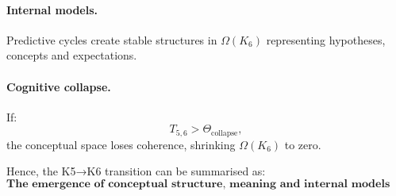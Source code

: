 \paragraph{Internal models.}
Predictive cycles create stable structures in $\Omega(K_6)$ representing
hypotheses, concepts and expectations.

\paragraph{Cognitive collapse.}
If:
\[
T_{5,6} > \Theta_{\mathrm{collapse}},
\]
the conceptual space loses coherence, shrinking $\Omega(K_6)$ to zero.

Hence, the K5→K6 transition can be summarised as:
\[
\textbf{The emergence of conceptual structure, meaning and internal models
from neural dynamics and synchronisation.}
\]
